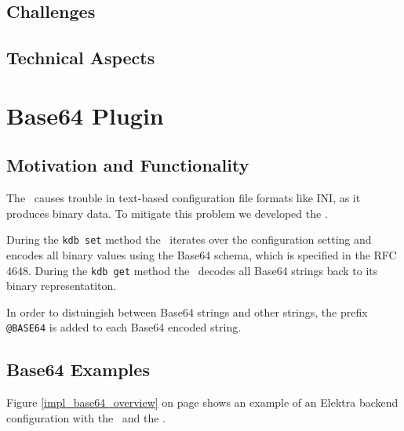 
\subsection{Challenges}


\subsection{Technical Aspects}





\section{Base64 Plugin}
\label{base64-plugin}

\subsection{Motivation and Functionality}

The \crypto ~causes trouble in text-based configuration file formats like INI, as it produces binary data.
To mitigate this problem we developed the \base.

During the \texttt{kdb set} method the \base ~iterates over the configuration setting and encodes all binary values using the Base64 schema, which is specified in the RFC 4648.\cite{rfc4648}
During the \texttt{kdb get} method the \base ~decodes all Base64 strings back to its binary representatiton.

In order to distuingish between Base64 strings and other strings, the prefix \texttt{@BASE64} is added to each Base64 encoded string. 

\subsection{Base64 Examples}

Figure \ref{impl_base64_overview} on page \pageref{impl_base64_overview} shows an example of an Elektra backend configuration with the \crypto ~and the \base.

